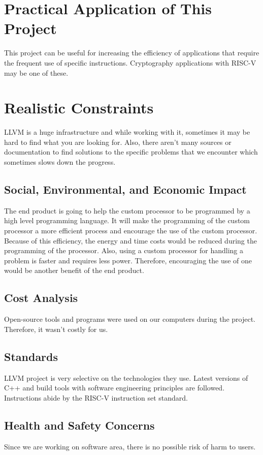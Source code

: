 \section{Practical Application of This Project}
This project can be useful for increasing the efficiency of applications that require the frequent use of specific instructions. Cryptography applications with RISC-V may be one of these.

\section{Realistic Constraints}
LLVM is a huge infrastructure and while working with it, sometimes it may be hard to find what you are looking for. Also, there aren’t many sources or documentation to find solutions to the specific problems that we encounter which sometimes slows down the progress.

\subsection{Social, Environmental, and Economic Impact}
The end product is going to help the custom processor to be programmed by a high level programming language. It will make the programming of the custom processor a more efficient process and encourage the use of the custom processor. Because of this efficiency, the energy and time costs would be reduced during the programming of the processor. Also, using a custom processor for handling a problem is faster and requires less power. Therefore, encouraging the use of one would be another benefit of the end product.

\subsection{Cost Analysis}
Open-source tools and programs were used on our computers during the project. Therefore, it wasn’t costly for us.

\subsection{Standards}
LLVM project is very selective on the technologies they use. Latest versions of C++ and build tools with software engineering principles are followed. Instructions abide by the RISC-V instruction set standard.

\subsection{Health and Safety Concerns}
Since we are working on software area, there is no possible risk of harm to users.

